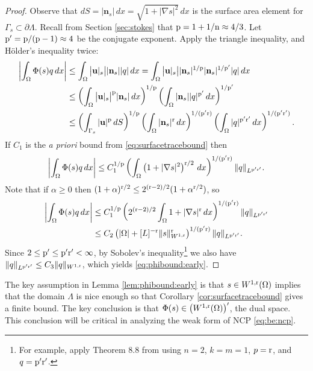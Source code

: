 \documentclass[hidelinks,onefignum,onetabnum,final]{siamart220329}  %
\newcommand{\grad}{\nabla}
\newcommand{\bn}{\mathbf{n}}
\newcommand{\bu}{\mathbf{u}}
\newcommand{\nn}{{\text{\textnormal{n}}}}
\newcommand{\pp}{{\text{\textnormal{p}}}}
\newcommand{\rr}{{\text{\textnormal{r}}}}
\begin{document}
\begin{proof}  Observe that $dS = |\bn_s|\,dx = \sqrt{1+|\grad s|^2}\,dx$ is the surface area element for $\Gamma_s \subset \partial \Lambda$.  Recall from Section \ref{sec:stokes} that $\pp=1+1/\nn \approx 4/3$.  Let $\pp'=\pp/(\pp-1) \approx 4$ be the conjugate exponent.  Apply the triangle inequality, and H\"older's inequality twice:
\begin{align}
\left|\int_\Omega \Phi(s) q\,dx\right| &\le \int_\Omega \big|\bu|_s\big| |\bn_s| |q|\,dx = \int_\Omega \big|\bu|_s\big| |\bn_s|^{1/\pp} |\bn_s|^{1/\pp'} |q|\,dx \label{eq:phibound:zero} \\
    &\le \left(\int_\Omega \big|\bu|_s\big|^\pp |\bn_s|\,dx\right)^{1/\pp} \left(\int_\Omega |\bn_s| |q|^{\pp'} \,dx\right)^{1/\pp'} \notag \\
    &\le \left(\int_{\Gamma_s} |\bu|^\pp \,dS\right)^{1/\pp} \left(\int_\Omega |\bn_s|^\rr \,dx\right)^{1/(\pp'\rr)} \left(\int_\Omega |q|^{\pp'\rr'} \,dx\right)^{1/(\pp'\rr')}. \notag
\end{align}
If $C_1$ is the \emph{a priori} bound from \eqref{eq:surfacetracebound} then
\begin{equation}
\left|\int_\Omega \Phi(s) q\,dx\right| \le C_1^{1/\pp} \left(\int_\Omega \left(1+|\grad s|^2\right)^{\rr/2}\,dx\right)^{1/(\pp'\rr)} \|q\|_{L^{\pp'\rr'}}.
\end{equation}
Note that if $\alpha\ge 0$ then $(1+\alpha)^{\rr/2} \le 2^{(\rr-2)/2} (1+\alpha^{\rr/2})$, so
\begin{align}
\left|\int_\Omega \Phi(s) q\,dx\right| &\le C_1^{1/\pp} \left(2^{(\rr-2)/2} \int_\Omega 1 + |\grad s|^\rr\,dx\right)^{1/(\pp'\rr)} \|q\|_{L^{\pp'\rr'}} \label{eq:phibound:one} \\
  &\le C_2 \left(|\Omega| + [L]^{-\rr}\|s\|_{W^{1,\rr}}^\rr\right)^{1/(\pp'\rr)} \|q\|_{L^{\pp'\rr'}}. \notag
\end{align}
Since $2 \le \pp' \le \pp'\rr' < \infty$, by Sobolev's inequality\footnote{For example, apply Theorem 8.8 from \cite{LiebLoss1997} using $n=2$, $k=m=1$, $p=\rr$, and $q=\pp'\rr'$.} we also have $\|q\|_{L^{\pp'\rr'}} \le C_3 \|q\|_{W^{1,\rr}}$, which yields \eqref{eq:phibound:early}.
\end{proof}

The key assumption in Lemma \ref{lem:phibound:early} is that $s\in W^{1,\rr}(\Omega)$ implies that the domain $\Lambda$ is nice enough so that Corollary \ref{cor:surfacetracebound} gives a finite bound.  The key conclusion is that $\Phi(s) \in \left(W^{1,\rr}(\Omega)\right)'$, the dual space.  This conclusion will be critical in analyzing the weak form of NCP \eqref{eq:be:ncp}.
\end{document}
